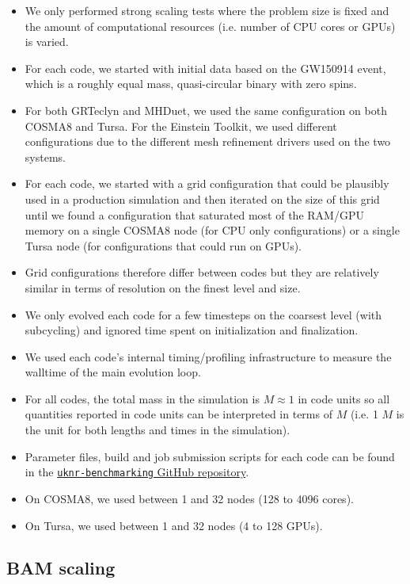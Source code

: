 \documentclass[12pt,a4paper]{article}
\numberwithin{figure}{subsection}
\begin{document}
\begin{itemize}
    \item We only performed strong scaling tests where the problem size is fixed
    and the amount of computational resources (i.e. number of CPU cores or GPUs)
    is varied.
    \item For each code, we started with initial data based on the GW150914
    event, which is a roughly equal mass, quasi-circular binary with zero spins.
    \item For both GRTeclyn and MHDuet, we used the same configuration on both
    COSMA8 and Tursa. For the Einstein Toolkit, we used different configurations
    due to the different mesh refinement drivers used on the two systems.
    \item For each code, we started with a grid configuration that could be
    plausibly used in a production simulation and then iterated on the size of
    this grid until we found a configuration that saturated most of the RAM/GPU
    memory on a single COSMA8 node (for CPU only configurations) or a single
    Tursa node (for configurations that could run on GPUs).
    \item Grid configurations therefore differ between codes but they are
    relatively similar in terms of resolution on the finest level and size.
    \item We only evolved each code for a few timesteps on the coarsest level
    (with subcycling) and ignored time spent on initialization and finalization.
    \item We used each code's internal timing/profiling infrastructure to
    measure the walltime of the main evolution loop.
    \item For all codes, the total mass in the simulation is $M \approx 1$ in
    code units so all quantities reported in code units can be interpreted in 
    terms of $M$ (i.e. 1 $M$ is the unit for both lengths and times in the simulation).
    \item Parameter files, build and job submission scripts for each code can be
    found in the
    \href{https://github.com/uknumericalrelativity/uknr-benchmarking}{\texttt{uknr-benchmarking}
    GitHub repository}.
    \item On COSMA8, we used between 1 and 32 nodes (128 to 4096 cores).
    \item On Tursa, we used between 1 and 32 nodes (4 to 128 GPUs).
\end{itemize}

\subsection{BAM scaling}
\end{document}
